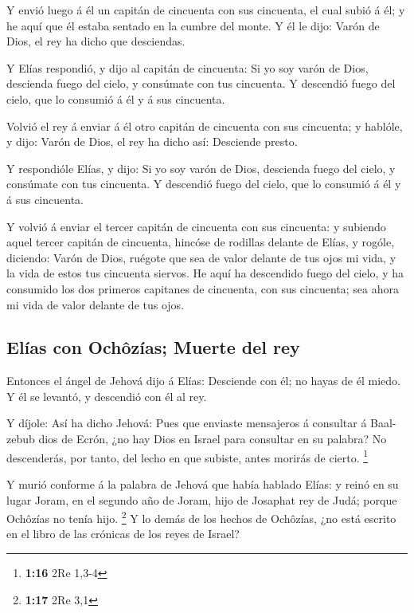  Y envió luego á él un capitán de cincuenta con sus
cincuenta, el cual subió á él; y he aquí que él estaba sentado en la
cumbre del monte. Y él le dijo: Varón de Dios, el rey ha dicho que
desciendas.

 Y Elías respondió, y dijo al capitán de cincuenta: Si yo
soy varón de Dios, descienda fuego del cielo, y consúmate con tus
cincuenta. Y descendió fuego del cielo, que lo consumió á él y á sus
cincuenta.

 Volvió el rey á enviar á él otro capitán de cincuenta con
sus cincuenta; y hablóle, y dijo: Varón de Dios, el rey ha dicho así:
Desciende presto.

 Y respondióle Elías, y dijo: Si yo soy varón de Dios,
descienda fuego del cielo, y consúmate con tus cincuenta. Y descendió
fuego del cielo, que lo consumió á él y á sus cincuenta.

 Y volvió á enviar el tercer capitán de cincuenta con sus
cincuenta: y subiendo aquel tercer capitán de cincuenta, hincóse de
rodillas delante de Elías, y rogóle, diciendo: Varón de Dios, ruégote
que sea de valor delante de tus ojos mi vida, y la vida de estos tus
cincuenta siervos.  He aquí ha descendido fuego del cielo,
y ha consumido los dos primeros capitanes de cincuenta, con sus
cincuenta; sea ahora mi vida de valor delante de tus ojos.

\hypertarget{eluxedas-con-ochuxf4zuxedas-muerte-del-rey}{%
\subsection{Elías con Ochôzías; Muerte del
rey}\label{eluxedas-con-ochuxf4zuxedas-muerte-del-rey}}

 Entonces el ángel de Jehová dijo á Elías: Desciende con
él; no hayas de él miedo. Y él se levantó, y descendió con él al rey.

 Y díjole: Así ha dicho Jehová: Pues que enviaste
mensajeros á consultar á Baal-zebub dios de Ecrón, ¿no hay Dios en
Israel para consultar en su palabra? No descenderás, por tanto, del
lecho en que subiste, antes morirás de cierto. \footnote{\textbf{1:16}
  2Re 1,3-4}

 Y murió conforme á la palabra de Jehová que había hablado
Elías: y reinó en su lugar Joram, en el segundo año de Joram, hijo de
Josaphat rey de Judá; porque Ochôzías no tenía hijo. \footnote{\textbf{1:17}
  2Re 3,1}  Y lo demás de los hechos de Ochôzías, ¿no está
escrito en el libro de las crónicas de los reyes de Israel?

